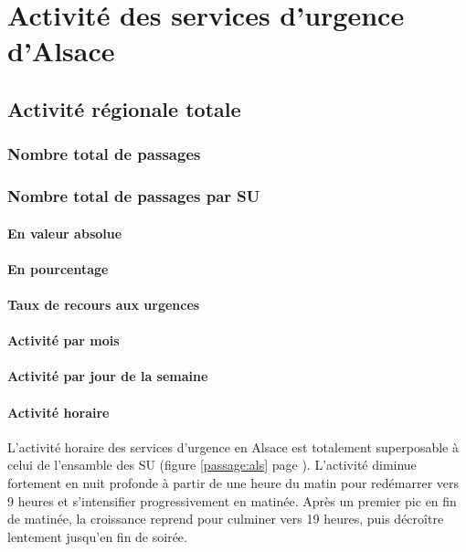 \documentclass[12pt,english,french]{report}\usepackage{graphicx, color}
\begin{document}
\part{Activité des services d'urgence d'Alsace}
\chapter{Activité régionale totale}
\section*{Nombre total de passages}
\section*{Nombre total de passages par SU}
\subsection*{En valeur absolue}
\subsection*{En pourcentage}
\subsection*{Taux de recours aux urgences}
\subsection*{Activité par mois}
\subsection*{Activité par jour de la semaine}
\subsection*{Activité horaire}


L'activité horaire des services d'urgence en Alsace est totalement superposable à celui de l'ensamble des SU (figure \ref{passage:als} page \pageref{passage:als}). L'activité diminue fortement en nuit profonde à partir de une heure du matin pour redémarrer vers 9 heures et s'intensifier progressivement en matinée. Après un premier pic en fin de matinée, la croissance reprend pour culminer vers 19 heures, puis décroître lentement jusqu'en fin de soirée.
\end{document}
